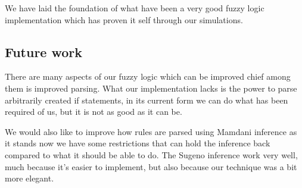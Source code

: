 We have laid the foundation of what have been a very good fuzzy logic
implementation which has proven it self through our simulations.

\subsection{Future work}\label{future work}
There are many aspects of our fuzzy logic which can be improved chief among
them is improved parsing. What our implementation lacks is the power to
parse arbitrarily created if statements, in its current form we can do what
has been required of us, but it is not as good as it can be.

We would also like to improve how rules are parsed using Mamdani inference as
it stands now we have some restrictions that can hold the inference back compared
to what it should be able to do. The Sugeno inference work very well, much because
it's easier to implement, but also because our technique was a bit more elegant.
